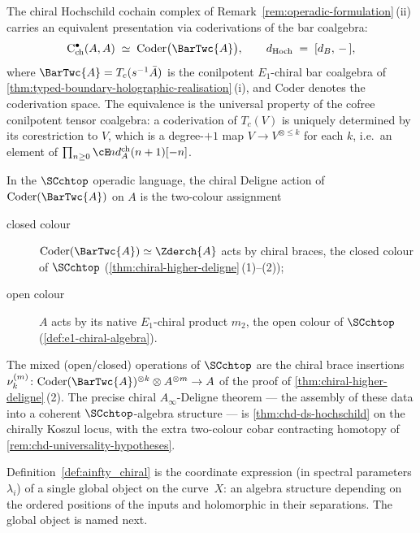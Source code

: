 \begin{remark}
\label{rem:bar-coder-SCchtop-colour-assignment}
%
%
The chiral Hochschild cochain complex of
\textup{Remark~\ref{rem:operadic-formulation}\,(ii)} carries an
equivalent presentation via coderivations of the bar coalgebra:
\begin{equation}\label{eq:bar-coder-iso}
 \mathrm{C}^{\bullet}_{\mathrm{ch}}(A, A)
 \;\simeq\;
 \mathrm{Coder}\bigl(\BarTwc{A}\bigr),
 \qquad
 d_{\mathrm{Hoch}} \;=\; [d_{B},\, -\,],
\end{equation}
where $\BarTwc{A} = T_{c}(s^{-1}\bar A)$ is the conilpotent
$E_{1}$-chiral bar coalgebra of
\cref{thm:typed-boundary-holographic-realisation}\,(i), and
$\mathrm{Coder}$ denotes the coderivation space.  The equivalence is
the universal property of the cofree conilpotent tensor coalgebra:
a coderivation of $T_{c}(V)$ is uniquely determined by its corestriction
to $V$, which is a degree-$+1$ map $V \to V^{\otimes \le k}$ for each
$k$, i.e.\ an element of
$\prod_{n \ge 0} \cE\!nd^{\mathrm{ch}}_{A}(n + 1)[-n]$.

In the $\SCchtop$ operadic language, the chiral Deligne action of
$\mathrm{Coder}(\BarTwc{A})$ on $A$ is the two-colour assignment
\begin{description}
\item[\textup{closed colour}] $\mathrm{Coder}(\BarTwc{A}) \simeq
\Zderch{A}$ acts by chiral braces, the closed colour of $\SCchtop$
(\cref{thm:chiral-higher-deligne}\,(1)--(2));
\item[\textup{open colour}] $A$ acts by its native $E_{1}$-chiral
product $m_{2}$, the open colour of $\SCchtop$
(\cref{def:e1-chiral-algebra}).
\end{description}
The mixed (open/closed) operations of $\SCchtop$ are the chiral
brace insertions $\nu^{(m)}_{k} \colon
\mathrm{Coder}(\BarTwc{A})^{\otimes k} \otimes A^{\otimes m} \to A$
of the proof of \cref{thm:chiral-higher-deligne}\,(2).  The precise
chiral $A_{\infty}$-Deligne theorem --- the assembly of these data
into a coherent $\SCchtop$-algebra structure --- is
\cref{thm:chd-ds-hochschild} on the chirally Koszul locus, with the
extra two-colour cobar contracting homotopy of
\cref{rem:chd-universality-hypotheses}.
\end{remark}

Definition~\ref{def:ainfty_chiral} is the coordinate expression (in spectral parameters $\lambda_i$) of a single global object on the curve~$X$: an algebra structure depending on the ordered positions of the inputs and holomorphic in their separations. The global object is named next.

